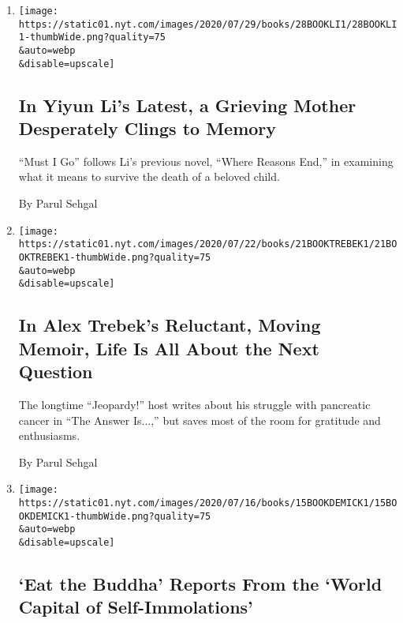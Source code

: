 \begin{enumerate}
\def\labelenumi{\arabic{enumi}.}
\item
  \href{/2020/07/28/books/review-must-i-go-yiyun-li.html}{}

  \texttt{[image: https://static01.nyt.com/images/2020/07/29/books/28BOOKLI1/28BOOKLI1-thumbWide.png?quality=75\\\&auto=webp\\\&disable=upscale]}

  \hypertarget{in-yiyun-lis-latest-a-grieving-mother-desperately-clings-to-memory}{%
  \subsection{In Yiyun Li's Latest, a Grieving Mother Desperately Clings
  to
  Memory}\label{in-yiyun-lis-latest-a-grieving-mother-desperately-clings-to-memory}}

  ``Must I Go'' follows Li's previous novel, ``Where Reasons End,'' in
  examining what it means to survive the death of a beloved child.

  By Parul Sehgal
\item
  \href{/2020/07/21/books/review-answer-is-alex-trebek-jeopardy-memoir.html}{}

  \texttt{[image: https://static01.nyt.com/images/2020/07/22/books/21BOOKTREBEK1/21BOOKTREBEK1-thumbWide.png?quality=75\\\&auto=webp\\\&disable=upscale]}

  \hypertarget{in-alex-trebeks-reluctant-moving-memoir-life-is-all-about-the-next-question}{%
  \subsection{In Alex Trebek's Reluctant, Moving Memoir, Life Is All
  About the Next
  Question}\label{in-alex-trebeks-reluctant-moving-memoir-life-is-all-about-the-next-question}}

  The longtime ``Jeopardy!'' host writes about his struggle with
  pancreatic cancer in ``The Answer Is...,'' but saves most of the room
  for gratitude and enthusiasms.

  By Parul Sehgal
\item
  \href{/2020/07/15/books/eat-buddha-life-death-tibetan-town-barbara-demick.html}{}

  \texttt{[image: https://static01.nyt.com/images/2020/07/16/books/15BOOKDEMICK1/15BOOKDEMICK1-thumbWide.png?quality=75\\\&auto=webp\\\&disable=upscale]}

  \hypertarget{eat-the-buddha-reports-from-the-world-capital-of-self-immolations}{%
  \subsection{`Eat the Buddha' Reports From the `World Capital of
  Self-Immolations'}\label{eat-the-buddha-reports-from-the-world-capital-of-self-immolations}}


\end{enumerate}
